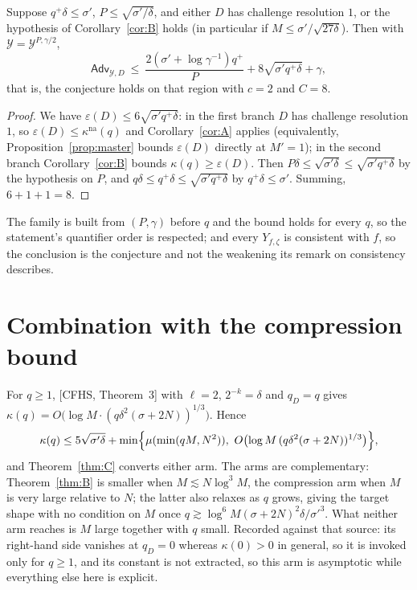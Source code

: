 \documentclass{aicr-solution}
\newcommand{\Adv}{\mathsf{Adv}}
\newcommand{\kna}{\kappa^{\mathrm{na}}}
\begin{document}
\begin{theorem}\label{thm:cprime}
Suppose $q^{+}\delta\le\sigma'$, $P\le\sqrt{\sigma'/\delta}$, and either $D$ has
challenge resolution $1$, or the hypothesis of Corollary~\ref{cor:B} holds (in
particular if $M\le\sigma'/\sqrt{27\delta}$). Then with
$\mathcal Y=\mathcal Y^{P,\gamma/2}$,
\[
  \Adv_{\mathcal Y,D}\ \le\
  \frac{2(\sigma'+\log\gamma^{-1})q^{+}}{P}+8\sqrt{\sigma'q^{+}\delta}+\gamma,
\]
that is, the conjecture holds on that region with $c=2$ and $C=8$.
\end{theorem}

\begin{proof}
We have $\varepsilon(D)\le6\sqrt{\sigma'q^{+}\delta}$: in the first branch $D$ has
challenge resolution $1$, so $\varepsilon(D)\le\kna(q)$ and
Corollary~\ref{cor:A} applies (equivalently, Proposition~\ref{prop:master}
bounds $\varepsilon(D)$ directly at $M'=1$); in the second branch
Corollary~\ref{cor:B} bounds $\kappa(q)\ge\varepsilon(D)$. Then
$P\delta\le\sqrt{\sigma'\delta}\le\sqrt{\sigma'q^{+}\delta}$ by the hypothesis on
$P$, and $q\delta\le q^{+}\delta\le\sqrt{\sigma'q^{+}\delta}$ by
$q^{+}\delta\le\sigma'$. Summing, $6+1+1=8$.
\end{proof}

The family is built from $(P,\gamma)$ before $q$ and the bound holds for every
$q$, so the statement's quantifier order is respected; and every $Y_{f,\zeta}$ is
consistent with $f$, so the conclusion is the conjecture and not the weakening
its remark on consistency describes.

\section{Combination with the compression bound}

For $q\ge1$, [CFHS, Theorem~3] with $\ell=2$, $2^{-k}=\delta$ and $q_D=q$ gives
$\kappa(q)=O\bigl(\log M\cdot(q\delta^{2}(\sigma+2N))^{1/3}\bigr)$. Hence
\[
  \kappa(q)\le5\sqrt{\sigma'\delta}+\min\Bigl\{\mu(\min(qM,N^{2})),\
  O\bigl(\log M\,(q\delta^{2}(\sigma+2N))^{1/3}\bigr)\Bigr\},
\]
and Theorem~\ref{thm:C} converts either arm. The arms are complementary:
Theorem~\ref{thm:B} is smaller when $M\lesssim N\log^{3}M$, the compression arm
when $M$ is very large relative to $N$; the latter also relaxes as $q$ grows,
giving the target shape with no condition on $M$ once
$q\gtrsim\log^{6}M(\sigma+2N)^{2}\delta/\sigma'^{3}$. What neither arm reaches is
$M$ large together with $q$ small. Recorded against that source: its right-hand
side vanishes at $q_D=0$ whereas $\kappa(0)>0$ in general, so it is invoked only
for $q\ge1$, and its constant is not extracted, so this arm is asymptotic while
everything else here is explicit.
\end{document}
